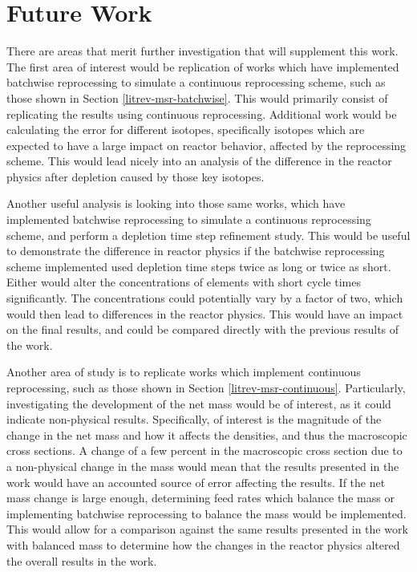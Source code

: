\section{Future Work}

There are areas that merit further investigation that will supplement this work.
The first area of interest would be replication of works which have implemented batchwise reprocessing to simulate a continuous reprocessing scheme, such as those shown in Section \ref{litrev-msr-batchwise}.
This would primarily consist of replicating the results using continuous reprocessing.
Additional work would be calculating the error for different isotopes, specifically isotopes which are expected to have a large impact on reactor behavior, affected by the reprocessing scheme.
This would lead nicely into an analysis of the difference in the reactor physics after depletion caused by those key isotopes.

Another useful analysis is looking into those same works, which have implemented batchwise reprocessing to simulate a continuous reprocessing scheme, and perform a depletion time step refinement study.
This would be useful to demonstrate the difference in reactor physics if the batchwise reprocessing scheme implemented used depletion time steps twice as long or twice as short.
Either would alter the concentrations of elements with short cycle times significantly.
The concentrations could potentially vary by a factor of two, which would then lead to differences in the reactor physics.
This would have an impact on the final results, and could be compared directly with the previous results of the work.

Another area of study is to replicate works which implement continuous reprocessing, such as those shown in Section \ref{litrev-msr-continuous}.
Particularly, investigating the development of the net mass would be of interest, as it could indicate non-physical results.
Specifically, of interest is the magnitude of the change in the net mass and how it affects the densities, and thus the macroscopic cross sections.
A change of a few percent in the macroscopic cross section due to a non-physical change in the mass would mean that the results presented in the work would have an accounted source of error affecting the results.
If the net mass change is large enough, determining feed rates which balance the mass or implementing batchwise reprocessing to balance the mass would be implemented.
This would allow for a comparison against the same results presented in the work with balanced mass to determine how the changes in the reactor physics altered the overall results in the work.



